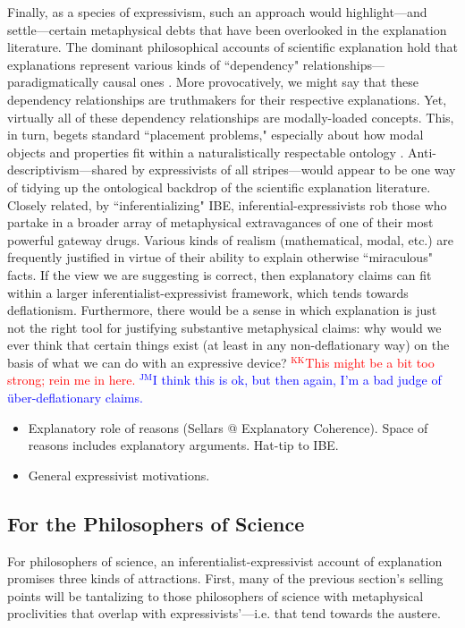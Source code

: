 \documentclass{article}
\theoremstyle{definition}
\theoremstyle{definition}
\theoremstyle{definition}
\theoremstyle{definition}
\theoremstyle{remark}
\theoremstyle{definition}
\theoremstyle{definition}
\newcommand{\kk}[1]{\textcolor{red}{$^{\textrm{KK}}${#1}}}
\newcommand{\jm}[1]{\textcolor{blue}{$^{\textrm{JM}}${#1}}}
\begin{document}
Finally, as a species of expressivism, such an approach would highlight---and settle---certain metaphysical debts that have been overlooked in the explanation literature. The dominant philosophical accounts of scientific explanation hold that explanations represent various kinds of ``dependency" relationships---paradigmatically causal ones \parencite{Lewis1986,Salmon1984,Strevens2008,Woodward2003}. More provocatively, we might say that these dependency relationships are truthmakers for their respective explanations. Yet, virtually all of these dependency relationships are modally-loaded concepts. This, in turn, begets standard ``placement problems," especially about how modal objects and properties fit within a naturalistically respectable ontology \parencite{Price2011}. Anti-descriptivism---shared by expressivists of all stripes---would appear to be one way of tidying up the ontological backdrop of the scientific explanation literature. Closely related, by ``inferentializing" IBE, inferential-expressivists rob those who partake in a broader array of metaphysical extravagances of one of their most powerful gateway drugs. Various kinds of realism (mathematical, modal, etc.) are frequently justified in virtue of their ability to explain otherwise ``miraculous" facts. If the view we are suggesting is correct, then explanatory claims can fit within a larger inferentialist-expressivist framework, which tends towards deflationism. Furthermore, there would be a sense in which explanation is just not the right tool for justifying substantive metaphysical claims: why would we ever think that certain things exist (at least in any non-deflationary way) on the basis of what we can do with an expressive device? \kk{This might be a bit too strong; rein me in here.} \jm{I think this is ok, but then again, I'm a bad judge of \"{u}ber-deflationary claims.}

\begin{itemize}

	\item Explanatory role of reasons (Sellars @ Explanatory Coherence). Space of reasons includes explanatory arguments. Hat-tip to IBE.
	\item General expressivist motivations.

\end{itemize}


\subsection{For the Philosophers of Science}
For philosophers of science, an inferentialist-expressivist account of explanation promises three kinds of attractions. First, many of the previous section's selling points will be tantalizing to those philosophers of science with metaphysical proclivities that overlap with expressivists'---i.e. that tend towards the austere.
\end{document}
